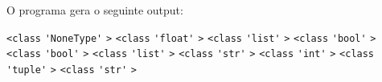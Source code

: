 \documentclass[12pt,varwidth=16cm,border=1pt]{standalone}
\begin{document}
O programa gera o seguinte output:

\verb+<class+ \verb+'NoneType'+ \verb+>+ \newline
\verb+<class+ \verb+'float'+ \verb+>+ \newline
\verb+<class+ \verb+'list'+ \verb+>+ \newline
\verb+<class+ \verb+'bool'+ \verb+>+ \newline
\verb+<class+ \verb+'bool'+ \verb+>+ \newline
\verb+<class+ \verb+'list'+ \verb+>+ \newline
\verb+<class+ \verb+'str'+ \verb+>+ \newline
\verb+<class+ \verb+'int'+ \verb+>+ \newline
\verb+<class+ \verb+'tuple'+ \verb+>+ \newline
\verb+<class+ \verb+'str'+ \verb+>+
\end{document}
